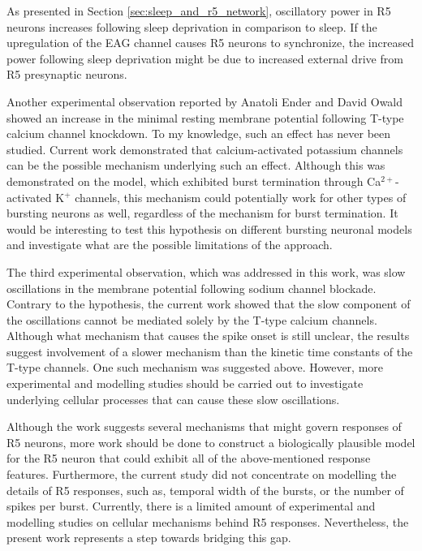 \documentclass[../main.tex]{subfiles}
\begin{document}
As presented in Section \ref{sec:sleep_and_r5_network}, oscillatory power in R5 neurons increases following sleep deprivation in comparison to sleep. If the upregulation of the EAG channel causes R5 neurons to synchronize, the increased power following sleep deprivation might be due to increased external drive from R5 presynaptic neurons.

Another experimental observation reported by Anatoli Ender and David Owald showed an increase in the minimal resting membrane potential following T-type calcium channel knockdown. To my knowledge, such an effect has never been studied. Current work demonstrated that calcium-activated potassium channels can be the possible mechanism underlying such an effect. Although this was demonstrated on the model, which exhibited burst termination through Ca$^{2+}$-activated K$^+$ channels, this mechanism could potentially work for other types of bursting neurons as well, regardless of the mechanism for burst termination. It would be interesting to test this hypothesis on different bursting neuronal models and investigate what are the possible limitations of the approach.

The third experimental observation, which was addressed in this work, was slow oscillations in the membrane potential following sodium channel blockade. Contrary to the hypothesis, the current work showed that the slow component of the oscillations cannot be mediated solely by the T-type calcium channels.
Although what mechanism that causes the spike onset is still unclear, the results suggest involvement of a slower mechanism than the kinetic time constants of the T-type channels. One such mechanism was suggested above. However, more experimental and modelling studies should be carried out to investigate underlying cellular processes that can cause these slow oscillations.

Although the work suggests several mechanisms that might govern responses of R5 neurons, more work should be done to construct a biologically plausible model for the R5 neuron that could exhibit all of the above-mentioned response features. Furthermore, the current study did not concentrate on modelling the details of R5 responses, such as, temporal width of the bursts, or the number of spikes per burst. Currently, there is a limited amount of experimental and modelling studies on cellular mechanisms behind R5 responses. Nevertheless, the present work represents a step towards bridging this gap.


\end{document}
